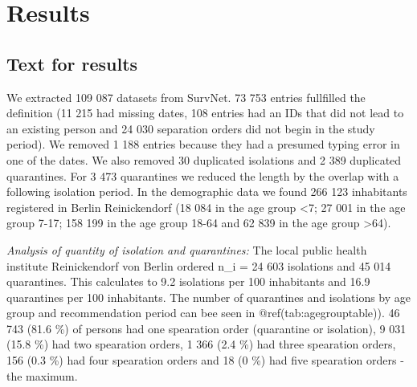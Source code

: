 \documentclass[
]{article}
\newenvironment{Shaded}{\begin{snugshade}}{\end{snugshade}}
\newcommand{\CommentTok}[1]{\textcolor[rgb]{0.56,0.35,0.01}{\textit{#1}}}
\newcommand{\FunctionTok}[1]{\textcolor[rgb]{0.00,0.00,0.00}{#1}}
\newcommand{\NormalTok}[1]{#1}
\newcommand{\OtherTok}[1]{\textcolor[rgb]{0.56,0.35,0.01}{#1}}
\newcommand{\SpecialCharTok}[1]{\textcolor[rgb]{0.00,0.00,0.00}{#1}}
\begin{document}
\hypertarget{results}{%
\section{Results}\label{results}}

\begin{Shaded}
\end{Shaded}

\hypertarget{text-for-results}{%
\subsection{Text for results}\label{text-for-results}}

We extracted 109 087 datasets from SurvNet. 73 753 entries fullfilled
the definition (11 215 had missing dates, 108 entries had an IDs that
did not lead to an existing person and 24 030 separation orders did not
begin in the study period). We removed 1 188 entries because they had a
presumed typing error in one of the dates. We also removed 30 duplicated
isolations and 2 389 duplicated quarantines. For 3 473 quarantines we
reduced the length by the overlap with a following isolation period. In
the demographic data we found 266 123 inhabitants registered in Berlin
Reinickendorf (18 084 in the age group \textless7; 27 001 in the age
group 7-17; 158 199 in the age group 18-64 and 62 839 in the age group
\textgreater64).

\emph{Analysis of quantity of isolation and quarantines:} The local
public health institute Reinickendorf von Berlin ordered n\_i = 24 603
isolations and 45 014 quarantines. This calculates to 9.2 isolations per
100 inhabitants and 16.9 quarantines per 100 inhabitants. The number of
quarantines and isolations by age group and recommendation period can
bee seen in @ref(tab:agegrouptable)). 46 743 (81.6 \%) of persons had
one spearation order (quarantine or isolation), 9 031 (15.8 \%) had two
spearation orders, 1 366 (2.4 \%) had three spearation orders, 156 (0.3
\%) had four spearation orders and 18 (0 \%) had five spearation orders
- the maximum.
\end{document}
